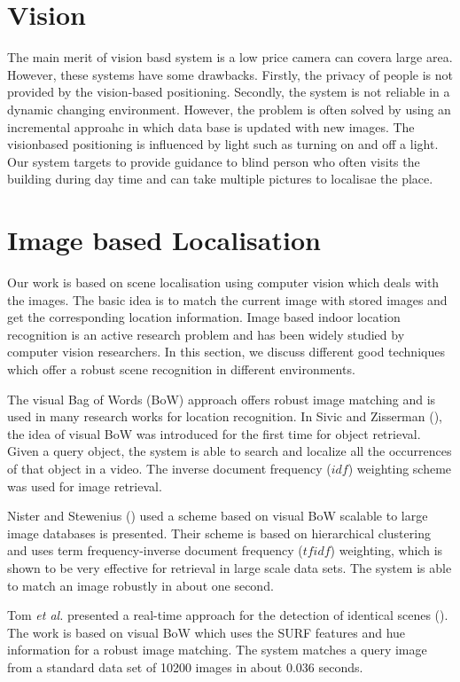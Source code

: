 \section{Vision}
\label{sec:vision}
The main merit of vision basd system is 
a low price camera can covera large area. However,
these systems have some drawbacks. Firstly, the privacy
of people is not provided by the vision-based positioning.
Secondly, the system is not reliable in a dynamic changing
environment. However, the problem is often solved 
by using an incremental approahc in which data base 
is updated with new images. The visionbased
positioning is influenced by light such as turning on and off
a light. Our system targets to provide guidance to blind person 
who often visits the building during day time and can take multiple pictures 
to localisae the place. 


\section{Image based Localisation}
\label{sec:image}

Our work is based on scene localisation using computer vision 
which deals with the images. The basic idea is to match the 
current image with stored images and get the corresponding 
location information. 
Image based indoor location recognition
is an active research problem and has been widely studied 
by computer vision researchers. In this section, 
we discuss different good techniques which offer a robust scene 
recognition in different environments.


The visual Bag of Words (BoW) approach offers robust image 
matching and is used in many 
research works for location recognition. 
In Sivic and Zisserman (\cite{sivic03}), the idea of visual BoW
was introduced for the
first time for object retrieval. 
Given a query object, the
system is able to search 
and localize all the occurrences of 
that object in a video. The 
inverse document frequency ($idf$)
weighting scheme was used for image 
retrieval.

Nister and Stewenius (\cite{nister06}) used 
a scheme based on visual BoW
scalable to large image databases is presented.
Their scheme is based on hierarchical clustering 
and uses term frequency-inverse document frequency ($tfidf$)
weighting, which
is shown to be very effective 
for retrieval in large scale data sets.
The system is able to match an image 
robustly in about one second.

Tom \emph{et al.} presented a real-time approach 
for the detection of identical scenes (\cite{tom08}). 
The work is based on visual BoW which uses the
SURF features and hue information 
for a robust  image matching. The system matches 
a query image from a standard data set of 10200 images 
in about 0.036 seconds.


